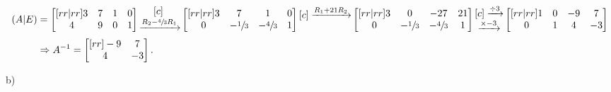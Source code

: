 \documentclass[a4paper,11pt]{article}
\begin{document}
\begin{align*}
(A|E) & = 
\begin{bmatrix}[rr|rr]
   3 &  7 &  1 &  0 \\
   4 &  9 &  0 &  1
\end{bmatrix}
\begin{matrix}[c] ~ \\ \xrightarrow{R_2-\sfrac{4}{3}R_1} \end{matrix}
\begin{bmatrix}[rr|rr]
   3 &             7 &  1             &  0 \\
   0 & -\sfrac{1}{3} &  -\sfrac{4}{3} &  1
\end{bmatrix}
\begin{matrix}[c] \xrightarrow{R_1+21R_2} \\ ~ \end{matrix}
\begin{bmatrix}[rr|rr]
   3 &             0 &  -27           & 21 \\
   0 & -\sfrac{1}{3} &  -\sfrac{4}{3} &  1
\end{bmatrix}
\begin{matrix}[c] \xrightarrow{\divisionsymbol 3} \\ \xrightarrow{\times -3} \end{matrix}
\begin{bmatrix}[rr|rr]
   1 & 0 & -9 &  7 \\
   0 & 1 &  4 & -3
\end{bmatrix}
\\
& \Rightarrow
A^{-1} = 
\begin{bmatrix}[rr]
   -9 &  7 \\
    4 & -3
\end{bmatrix}.
\end{align*}

b) 
\end{document}

